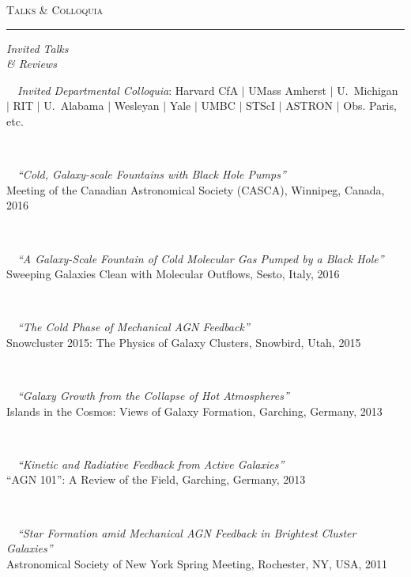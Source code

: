 \documentclass[11pt]{article}
\makeatletter
\def\vhrulefill#1{\leavevmode\leaders\hrule\@height#1\hfill \kern\z@}
\makeatother
\begin{document}
\vspace{4mm}




\textsc{Talks \& Colloquia} \vhrulefill{0.4pt}

\vspace{4mm}

\hspace{2.5mm} \parbox{1.5in}{\textit{Invited Talks \\ \& Reviews }}
\parbox{5.15in}{
\textbullet~~\textit{Invited Departmental Colloquia}: Harvard CfA $|$ UMass Amherst $|$ U.~Michigan $|$ RIT $|$ U.~Alabama $|$ Wesleyan $|$ Yale $|$ UMBC $|$ STScI $|$ ASTRON $|$ Obs. Paris, etc.}\\


\hspace{42mm} \parbox{5.15in}{
\textbullet~~\textit{``Cold, Galaxy-scale Fountains with Black Hole Pumps''}\\ Meeting of the Canadian Astronomical Society (CASCA), Winnipeg, Canada, 2016}\\


\hspace{42mm} \parbox{5.15in}{
\textbullet~~\textit{``A Galaxy-Scale Fountain of Cold Molecular Gas Pumped by a Black Hole''}\\ Sweeping Galaxies Clean with Molecular Outflows, Sesto, Italy, 2016}\\



\hspace{42mm} \parbox{5.15in}{
\textbullet~~\textit{``The Cold Phase of Mechanical AGN Feedback''}\\ Snowcluster 2015: The Physics of Galaxy Clusters, Snowbird, Utah, 2015}\\


\hspace{42mm} \parbox{5.15in}{
\textbullet~~\textit{``Galaxy Growth from the Collapse of Hot Atmospheres''}\\ Islands in the Cosmos: Views of Galaxy Formation, Garching, Germany, 2013}\\

\hspace{42mm} \parbox{5.15in}{
\textbullet~~\textit{``Kinetic and Radiative Feedback from Active Galaxies''} \\ ``AGN 101'': A Review of the Field, Garching, Germany, 2013}\\


\hspace{42mm} \parbox{5.15in}{
\textbullet~~\textit{``Star Formation amid Mechanical AGN Feedback in Brightest Cluster Galaxies''}\\ Astronomical Society of New York Spring Meeting, Rochester, NY, USA, 2011}\\
\end{document}
